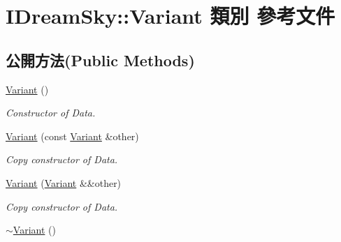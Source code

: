 \hypertarget{class_i_dream_sky_1_1_variant}{}\section{I\+Dream\+Sky\+:\+:Variant 類別 參考文件}
\label{class_i_dream_sky_1_1_variant}
\subsection*{公開方法(Public Methods)}
\begin{DoxyCompactItemize}
\item 
\hyperlink{class_i_dream_sky_1_1_variant_af3cb79522facc25695a066af74a08fc2}{Variant} ()\hypertarget{class_i_dream_sky_1_1_variant_af3cb79522facc25695a066af74a08fc2}{}\label{class_i_dream_sky_1_1_variant_af3cb79522facc25695a066af74a08fc2}

\begin{DoxyCompactList}\small\item\em Constructor of Data. \end{DoxyCompactList}\item 
\hyperlink{class_i_dream_sky_1_1_variant_ad086adaf0bccad716a2508c8f8465937}{Variant} (const \hyperlink{class_i_dream_sky_1_1_variant}{Variant} \&other)\hypertarget{class_i_dream_sky_1_1_variant_ad086adaf0bccad716a2508c8f8465937}{}\label{class_i_dream_sky_1_1_variant_ad086adaf0bccad716a2508c8f8465937}

\begin{DoxyCompactList}\small\item\em Copy constructor of Data. \end{DoxyCompactList}\item 
\hyperlink{class_i_dream_sky_1_1_variant_a0610fd7c09edc4c575181cec2ede830a}{Variant} (\hyperlink{class_i_dream_sky_1_1_variant}{Variant} \&\&other)\hypertarget{class_i_dream_sky_1_1_variant_a0610fd7c09edc4c575181cec2ede830a}{}\label{class_i_dream_sky_1_1_variant_a0610fd7c09edc4c575181cec2ede830a}

\begin{DoxyCompactList}\small\item\em Copy constructor of Data. \end{DoxyCompactList}\item 
\hyperlink{class_i_dream_sky_1_1_variant_afefce84ee3f94c9154c69e2e9a62f0b0}{$\sim$\+Variant} ()\hypertarget{class_i_dream_sky_1_1_variant_afefce84ee3f94c9154c69e2e9a62f0b0}{}\label{class_i_dream_sky_1_1_variant_afefce84ee3f94c9154c69e2e9a62f0b0}


\end{DoxyCompactItemize}
